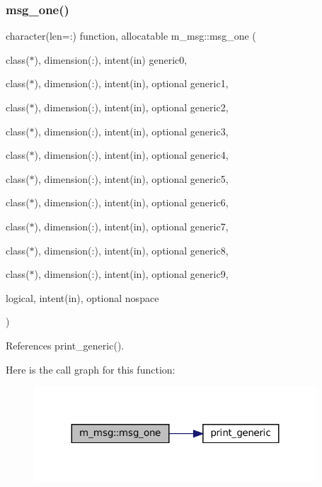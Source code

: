 \subsubsection{\texorpdfstring{msg\+\_\+one()}{msg\_one()}}
{\footnotesize\ttfamily character(len=\+:) function, allocatable m\+\_\+msg\+::msg\+\_\+one (\begin{DoxyParamCaption}\item[{class($\ast$), dimension(\+:), intent(in)}]{generic0,  }\item[{class($\ast$), dimension(\+:), intent(in), optional}]{generic1,  }\item[{class($\ast$), dimension(\+:), intent(in), optional}]{generic2,  }\item[{class($\ast$), dimension(\+:), intent(in), optional}]{generic3,  }\item[{class($\ast$), dimension(\+:), intent(in), optional}]{generic4,  }\item[{class($\ast$), dimension(\+:), intent(in), optional}]{generic5,  }\item[{class($\ast$), dimension(\+:), intent(in), optional}]{generic6,  }\item[{class($\ast$), dimension(\+:), intent(in), optional}]{generic7,  }\item[{class($\ast$), dimension(\+:), intent(in), optional}]{generic8,  }\item[{class($\ast$), dimension(\+:), intent(in), optional}]{generic9,  }\item[{logical, intent(in), optional}]{nospace }\end{DoxyParamCaption})\hspace{0.3cm}{\ttfamily [private]}}



References print\+\_\+generic().

Here is the call graph for this function\+:\nopagebreak
\begin{figure}[H]
\begin{center}
\leavevmode
\includegraphics[width=299pt]{namespacem__msg_a069f107ba79e88a43dd5c835080eff1a_cgraph}
\end{center}
\end{figure}
\mbox{\label{namespacem__msg_a2e19921e3e57824c605acd4f7c83ad83}} 
